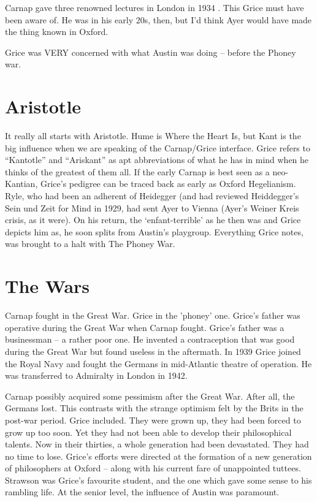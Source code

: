\documentclass[10pt,titlepage]{book}
\begin{document}
{Carnap gave three renowned lectures in London in 1934 \cite{carnap35}.
This  Grice must have been aware of. He was in his early 
20s, then, but I’d think Ayer  would have made the thing known in Oxford.
 
Grice was VERY concerned with what Austin was doing -- before the Phoney war.

\section{Aristotle}

It really all starts with Aristotle.
Hume is Where the Heart Is, but Kant is the big influence when we are speaking of the Carnap/Grice interface. 
Grice refers to “Kantotle” and “Ariskant” as apt abbreviations of what he has in mind when he thinks of the greatest of them all.
If the early Carnap is best seen as a neo-Kantian, Grice’s pedigree can be traced back as early as Oxford Hegelianism.
Ryle, who had been an adherent of  Heidegger (and had reviewed Heiddegger’s Sein und Zeit for Mind in 1929, had sent Ayer to Vienna (Ayer’s Weiner Kreis 
crisis, as it were). On his return, the  ‘enfant-terrible’ as he then was and Grice depicts him as, he soon splits from  Austin's playgroup.
Everything Grice notes, was brought to a halt with The Phoney War.

\section{The Wars}

Carnap fought in the Great War.
Grice in the 'phoney' one. Grice's father  
was operative during the Great War when Carnap fought.
Grice's father was a businessman -- a rather poor one.
He invented a contraception that was good during the Great War but found useless in the aftermath.
In 1939 Grice joined the Royal Navy and fought the Germans in mid-Atlantic theatre of operation.
He was transferred to Admiralty in London in 1942. 
 
Carnap possibly acquired some pessimism after the Great War.
After all, the Germans lost.
This contrasts with the strange optimism felt by the Brits in the post-war period.
Grice included.
They were grown up, they had been forced to grow up too soon.
Yet they had not been able to develop their philosophical talents.
Now in their thirties, a whole generation had been devastated.
They had no time to lose.
Grice's efforts were directed at the formation of a new generation of philosophers at Oxford -- along with his  
current fare of unappointed tuttees.
Strawson was Grice's favourite student, and the one which gave some sense to his rambling life.
At the senior level, the influence of Austin was paramount.

}
\end{document}

